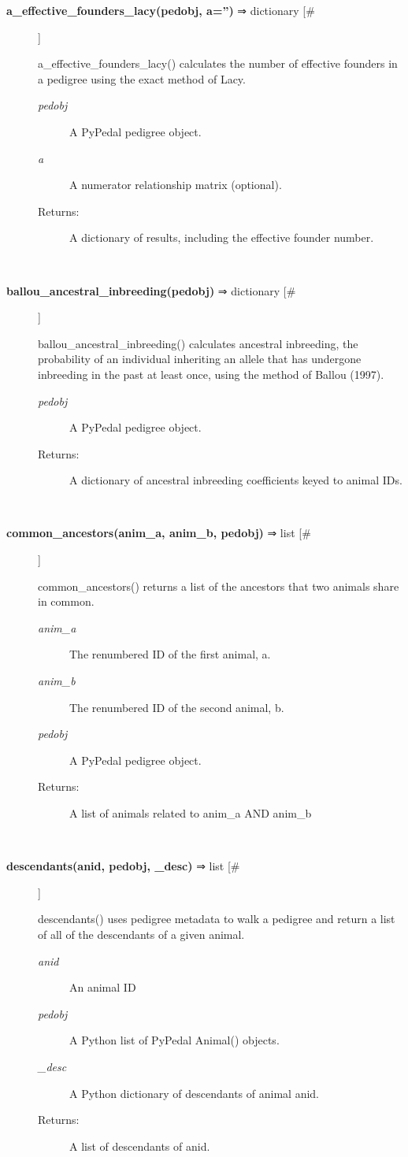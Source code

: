 \begin{description}
\item[\textbf{a\_effective\_founders\_lacy(pedobj, a='')} ⇒ dictionary [\#]
]
\par a\_effective\_founders\_lacy() calculates the number of effective founders in a
pedigree using the exact method of Lacy.
\begin{description}
\item[\textit{pedobj}
]
A PyPedal pedigree object.
\item[\textit{a}
]
A numerator relationship matrix (optional).
\item[Returns:
]
A dictionary of results, including the effective founder number.
\end{description}\\

\item[\textbf{ballou\_ancestral\_inbreeding(pedobj)} ⇒ dictionary [\#]
]
\par ballou\_ancestral\_inbreeding() calculates ancestral inbreeding,
the probability of an individual inheriting an allele that has
undergone inbreeding in the past at least once, using the method
of Ballou (1997).
\begin{description}
\item[\textit{pedobj}
]
A PyPedal pedigree object.
\item[Returns:
]
A dictionary of ancestral inbreeding coefficients keyed to animal IDs.
\end{description}\\

\item[\textbf{common\_ancestors(anim\_a, anim\_b, pedobj)} ⇒ list [\#]
]
\par common\_ancestors() returns a list of the ancestors that two animals share in common.
\begin{description}
\item[\textit{anim\_a}
]
The renumbered ID of the first animal, a.
\item[\textit{anim\_b}
]
The renumbered ID of the second animal, b.
\item[\textit{pedobj}
]
A PyPedal pedigree object.
\item[Returns:
]
A list of animals related to anim\_a AND anim\_b
\end{description}\\

\item[\textbf{descendants(anid, pedobj, \_desc)} ⇒ list [\#]
]
\par descendants() uses pedigree metadata to walk a pedigree and return a list of all
of the descendants of a given animal.
\begin{description}
\item[\textit{anid}
]
An animal ID
\item[\textit{pedobj}
]
A Python list of  PyPedal Animal() objects.
\item[\textit{\_desc}
]
A Python dictionary of descendants of animal anid.
\item[Returns:
]
A list of descendants of anid.
\end{description}\\


\end{description}
